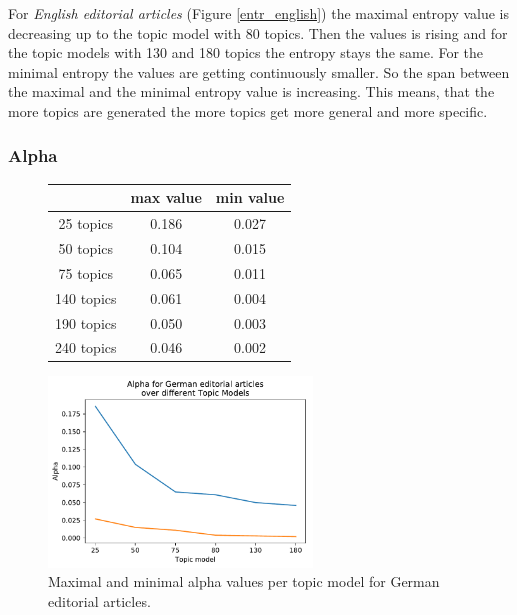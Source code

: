 For \textit{English editorial articles} (Figure \ref{entr_english}) the maximal entropy value is decreasing up to the topic model with 80 topics. Then the values is rising and for the topic models with 130 and 180 topics the entropy stays the same. For the minimal entropy the values are getting continuously smaller. So the span between the maximal and the minimal entropy value is increasing. This means, that the more topics are generated the more topics get more general and more specific. 

\subsubsection{Alpha}
\begin{figure}
	\begin{minipage}{0.5\textwidth}
		\centering
			\begin{tabular}[t]{c|cc}
				&max value & min value\\
				\hline
				25 topics&0.186&0.027\\
				50 topics&0.104&0.015\\
				75 topics&0.065&0.011\\
				140 topics&	0.061&0.004\\
				190 topics &0.050&0.003\\
				240 topics&	0.046&0.002\\
			\end{tabular}
	\end{minipage}%
	\begin{minipage}{0.5\textwidth}
		\centering
		\includegraphics[width=7cm]{gfx/Eval_IC/German_Editorial_Alpha.pdf}
	\end{minipage}
	\caption{Maximal and minimal alpha values per topic model for German editorial articles.}
	\label{alpha_ger}
\end{figure}
